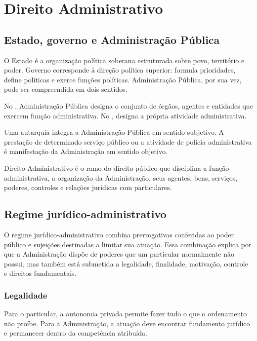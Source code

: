 \chapter{Direito Administrativo}

\section{Estado, governo e Administração Pública}

O Estado é a organização política soberana estruturada sobre povo, território e poder. Governo corresponde à direção política superior: formula prioridades, define políticas e exerce funções políticas. Administração Pública, por sua vez, pode ser compreendida em dois sentidos.

No , Administração Pública designa o conjunto de órgãos, agentes e entidades que exercem função administrativa. No , designa a própria atividade administrativa.

\begin{exemplo}
Uma autarquia integra a Administração Pública em sentido subjetivo. A prestação de determinado serviço público ou a atividade de polícia administrativa é manifestação da Administração em sentido objetivo.
\end{exemplo}

Direito Administrativo é o ramo do direito público que disciplina a função administrativa, a organização da Administração, seus agentes, bens, serviços, poderes, controles e relações jurídicas com particulares.

\section{Regime jurídico-administrativo}

O regime jurídico-administrativo combina prerrogativas conferidas ao poder público e sujeições destinadas a limitar sua atuação. Essa combinação explica por que a Administração dispõe de poderes que um particular normalmente não possui, mas também está submetida a legalidade, finalidade, motivação, controle e direitos fundamentais.

\subsection{Legalidade}

Para o particular, a autonomia privada permite fazer tudo o que o ordenamento não proíbe. Para a Administração, a atuação deve encontrar fundamento jurídico e permanecer dentro da competência atribuída.

